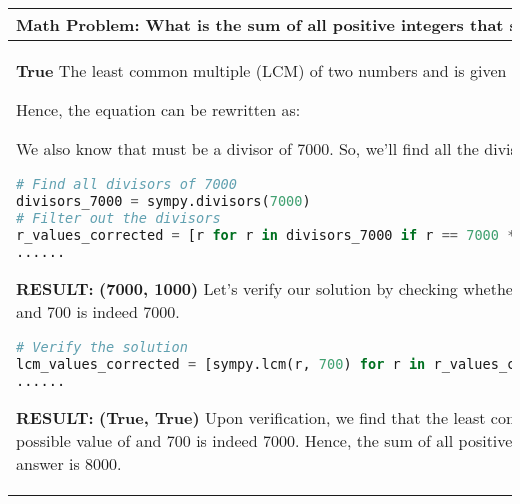 \documentclass{article} \usepackage{iclr2023_conference,times}
\begin{document}
\begin{table*}[ht]
    \centering
    \begin{tabular}{p{}|p{}|p{}}
    \toprule
     \multicolumn{3}{p{0.90\textwidth}}{\small \textbf{Math Problem}:  What is the sum of all positive integers  that satisfy } \\
     
    \midrule

    \small \textbf{True} 
\newline\newline
The least common multiple (LCM) of two numbers  and  is given by the formula:


Hence, the equation can be rewritten as:


We also know that  must be a divisor of 7000. So, we'll find all the divisors of 7000.\newline
\lstset{style=mystyle}
     \begin{lstlisting}[language=Python]
# Find all divisors of 7000
divisors_7000 = sympy.divisors(7000)
# Filter out the divisors
r_values_corrected = [r for r in divisors_7000 if r == 7000 * sympy.gcd(r, 700) // 700]
......
     \end{lstlisting} 
    \textbf{RESULT:}\newline
    \textbf{(7000, 1000)}\newline
    Let's verify our solution by checking whether the LCM of each possible  and 700 is indeed 7000.
    \lstset{style=mystyle}
     \begin{lstlisting}[language=Python]
# Verify the solution
lcm_values_corrected = [sympy.lcm(r, 700) for r in r_values_corrected]
......
     \end{lstlisting} 
    \textbf{RESULT:}\newline
    \textbf{(True, True)}\newline
    Upon verification, we find that the least common multiple (LCM) of each possible value of  and 700 is indeed 7000.
    Hence, the sum of all positive integers  that satisfy  is .
    The answer is 8000.
\small


\end{tabular}
\end{table*}
\end{document}

